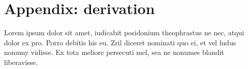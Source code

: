 \documentclass[10pt,onecolumn]{article}
\begin{document}


\appendix
%
\section{Appendix: derivation}
%
Lorem ipsum dolor sit amet, iudicabit posidonium theophrastus ne nec, atqui dolor ex pro. Porro debitis his eu. Zril diceret nominati quo ei, et vel ludus nonumy vidisse. Ex tota meliore persecuti mel, sea ne nonumes blandit liberavisse.
\end{document}
